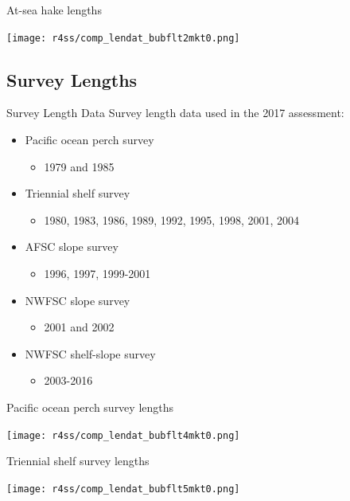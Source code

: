 \documentclass[pdf]{beamer}\usepackage[]{graphicx}\usepackage[]{color}
\begin{document}
\begin{frame}{At-sea hake lengths}
  \begin{center}
    \texttt{[image: r4ss/comp\_lendat\_bubflt2mkt0.png]}
  \end{center}
\end{frame}

\subsection{Survey Lengths}
\begin{frame}{Survey Length Data}
  Survey length data used in the 2017 assessment:
  \begin{itemize}
    \item Pacific ocean perch survey
      \begin{itemize}
        \item 1979 and 1985
      \end{itemize}
    \item Triennial shelf survey
      \begin{itemize}
        \item 1980, 1983, 1986, 1989, 1992, 1995, 1998, 2001, 2004
      \end{itemize}
    \item AFSC slope survey
      \begin{itemize}
        \item 1996, 1997, 1999-2001
      \end{itemize}
    \item NWFSC slope survey
      \begin{itemize}
        \item 2001 and 2002
      \end{itemize}
    \item NWFSC shelf-slope survey
      \begin{itemize}
        \item 2003-2016
      \end{itemize}
  \end{itemize}
\end{frame}

\begin{frame}{Pacific ocean perch survey lengths}
  \begin{center}
    \texttt{[image: r4ss/comp\_lendat\_bubflt4mkt0.png]}
  \end{center}
\end{frame}

\begin{frame}{Triennial shelf survey lengths}
  \begin{center}
    \texttt{[image: r4ss/comp\_lendat\_bubflt5mkt0.png]}
  \end{center}
\end{frame}
\end{document}
